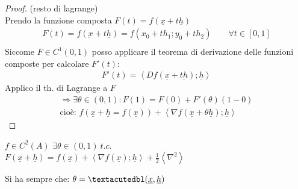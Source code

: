 \documentclass[a4paper, oneside]{article}
\begin{document}
        \begin{proof}
            (resto di lagrange)\\
            Prendo la funzione composta $F(t) = f(\underline{x} + t \underline{h})$ 
            \begin{gather*}
                F(t) = f(\underbar{x} + t \underline{h}) = f(x_0+t h_1;y_0+t h_2) \qquad \forall t \in [0,1]\\
            \end{gather*}
            Siccome $F \in C^1(0,1)$ posso applicare il teorema di derivazione delle funzioni composte per calcolare $F'(t)$:
            \begin{gather*}
                F'(t) = \left\langle Df(\underline{x} + t\underbar{h}) ; \underline{h} \right\rangle
            \end{gather*}
            Applico il th. di Lagrange a $F$
            \begin{gather*}
                \Rightarrow \exists \theta \in (0,1): F(1) = F(0) + F'(\theta)(1-0)\\
                \text{cioè: }f(\underline{x} + \underline{h} = f(\underline{x})) + \left\langle \nabla f(\underline{x} + \theta \underline{h}); \underline{h} \right\rangle  
            \end{gather*}
        \end{proof}
        \begin{theorem}
             $f \in C^2(A)$  $\exists \theta \in (0,1) \ t.c.$\\
            $F(\underline{x}+ \underline{h}) = f(\underline{x}) + \left\langle \nabla f(\underline{x}); \underline{h}\right\rangle + \frac{1}{2} \left\langle \nabla^2 \right\rangle $
        \end{theorem}
    \begin{observation}
            Si ha sempre che: $\theta = \textacutedbl(\underline{x}, \underline{h})$\\
        \end{observation}
\end{document}
